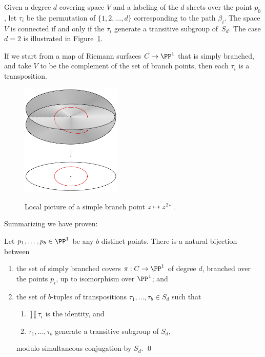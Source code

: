 Given a degree $d$ covering space $V$ and a labeling of the $d$ sheets
over the point $p_0$, let $\tau_i$ be the permutation of $\{1,2,\dots,d\}$
corresponding to the path $\beta_i$. The space $V$ is connected if and
only if the $\tau_{i}$ generate a transitive subgroup of~$S_{d}$. The
case $d=2$ is illustrated in Figure~\ref{square root function graph}.

If we start from a map of Riemann surfaces $C\to \PP^{1}$ that is
 simply branched, and take $V$ to be the complement of the set of
 branch points,
 then each $\tau_i$ is a transposition.

\begin{figure}
\vskip1pt
\includegraphics[height=2.1in,trim=0 2 0 0,clip]{main/Fig05-2-good}
\vskip-3pt
\caption{Local picture of a simple branch point $z \mapsto z^2` `$.
}
%
%
\label{square root function graph}
\end{figure}

Summarizing we have proven:
   \begin{lemma}
   \label{branched cover classification}
   Let $p_1,\dots, p_b \in \PP^1$ be any $b$
distinct
points. There is a
   natural bijection between
   \begin{enumerate}
   \item the set of  simply branched covers $\pi : C \to \PP^1$ of
   degree $d$, branched over the points $p_i$, up to isomorphism over
   $\PP^1$; and
   \item the set of $b$-tuples of transpositions $\tau_1, \dots, \tau_b
   \in S_d$ such that
\smallbreak
\begin{enumerate}
 \item $\prod \tau_i$ is the identity, and
 \item $\tau_1, \dots,
   \tau_b$ generate a transitive subgroup of $S_d$,
\end{enumerate}
\smallbreak
\noindent modulo simultaneous
   conjugation by $S_d$.
   \qed
   \end{enumerate}
\let\qed\relax
   \end{lemma}

